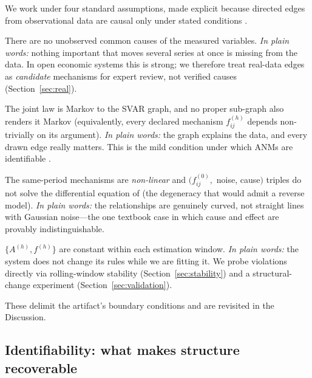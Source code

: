 We work under four standard assumptions, made explicit because directed edges
from observational data are causal only under stated conditions
\citep{Pearl2009,peters2014causal}.
\begin{assumption}\label{as:suff}
There are no unobserved common causes of the measured variables. \emph{In plain
words:} nothing important that moves several series at once is missing from the
data. In open economic systems this is strong; we therefore treat real-data edges
as \emph{candidate} mechanisms for expert review, not verified causes
(Section~\ref{sec:real}).
\end{assumption}
\begin{assumption}\label{as:markov}
The joint law is Markov to the SVAR graph, and no proper sub-graph also renders
it Markov (equivalently, every declared mechanism $f^{(h)}_{ij}$ depends
non-trivially on its argument). \emph{In plain words:} the graph explains the
data, and every drawn edge really matters. This is the mild condition under which
ANMs are identifiable \citep{peters2014causal}.
\end{assumption}
\begin{assumption}\label{as:restrict}
The same-period mechanisms are \emph{non-linear} and $(f^{(0)}_{ij},$ noise,
cause$)$ triples do not solve the differential equation of
\citet[Cond.~18]{peters2014causal} (the degeneracy that would admit a reverse
model). \emph{In plain words:} the relationships are genuinely curved, not
straight lines with Gaussian noise---the one textbook case in which cause and
effect are provably indistinguishable.
\end{assumption}
\begin{assumption}\label{as:stat}
$\{A^{(h)},f^{(h)}\}$ are constant within each estimation window. \emph{In plain
words:} the system does not change its rules while we are fitting it. We probe
violations directly via rolling-window stability (Section~\ref{sec:stability})
and a structural-change experiment (Section~\ref{sec:validation}).
\end{assumption}
These delimit the artifact's boundary conditions and are revisited in the
Discussion.

\subsection{Identifiability: what makes structure recoverable}
\label{sec:identif}

